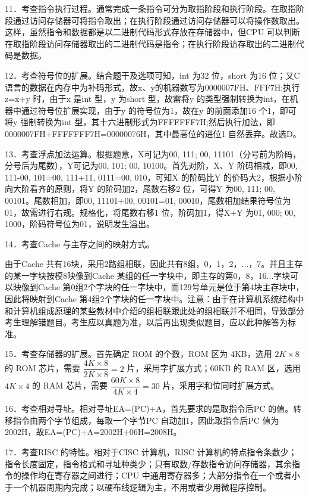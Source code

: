 \documentclass[UTF8,11pt]{ctexart}
\begin{document}
11．考查指令执行过程。通常完成一条指令可分为取指阶段和执行阶段。在取指阶段通过访问存储器可将指令取出；在执行阶段通过访问存储器可以将操作数取出。这样，虽然指令和数据都是以二进制代码形式存放在存储器中，但CPU 可以判断在取指阶段访问存储器取出的二进制代码是指令；在执行阶段访存取出的二进制代码是数据。


12．考查符号位的扩展。结合题干及选项可知，int 为32 位，short 为16 位；又C 语言的数据在内存中为补码形式，故x、y的机器数写为0000007FH、FFF7H;执行z=x+y 时，由于x 是int 型，y 为short 型，故需将y 的类型强制转换为int，在机器中通过符号位扩展实现，由于y 的符号位为1，故在y 的前面添加16 个1，即可将y 强制转换为int 型，其十六进制形式为FFFFFFF7H;然后执行加法，即0000007FH+FFFFFFF7H=00000076H，其中最高位的进位1 自然丢弃。故选D。


13．考查浮点加法运算。根据题意，X可记为00, 111; 00, 11101（分号前为阶码，分号后为尾数），Y可记为00, 101; 00, 10100。首先对阶，X、Y 阶码相减，即00, 111-00, 101=00, 111+11, 0111=00, 010，可知X 的阶码比Y 的价码大2，根据小阶向大阶看齐的原则，将Y 的阶码加2，尾数右移2 位，可得Y 为00, 111; 00, 00101。尾数相加，即00, 11101+00, 00101=01, 00010，尾数相加结果符号位为01，故需进行右规。规格化，将尾数右移1 位，阶码加1，得X+Y 为01, 000; 00, 1000，阶码符号位为01，说明发生溢出。


14．考查Cache 与主存之间的映射方式。


由于Cache 共有16块，采用2路组相联，因此共有8组，0，1，2，...，7。并且主存的某一字块按模8映像到Cache 某组的任一字块中，即主存的第0，8，16...字块可以映像到Cache 第0组2个字块的任一字块中，而129号单元是位于第4块主存块中，因此将映射到Cache 第4组2个字块的任一字块中。注意：由于在计算机系统结构中和计算机组成原理的某些教材中介绍的组相联跟此处的组相联并不相同，导致部分考生理解错题目。考生应以真题为准，以后再出现类似题目，应以此种解答为标准。


15．考查存储器的扩展。首先确定 ROM 的个数，ROM 区为 4KB，选用 \(\displaystyle 2K\times8\) 的 ROM 芯片，需要 \(\displaystyle \dfrac{\displaystyle 4K\times8}{\displaystyle 2K\times8}=2\) 片，采用字扩展方式；60KB 的 RAM 区，选用 \(\displaystyle 4K\times4\) 的 RAM 芯片，需要 \(\displaystyle \dfrac{\displaystyle 60K\times8}{\displaystyle 4K\times4}=30\) 片，采用字和位同时扩展方式。


16．考查相对寻址。相对寻址EA=(PC)+A，首先要求的是取指令后PC 的值。转移指令由两个字节组成，每取一个字节PC 自动加1，因此取指令后PC 值为2002H，故EA=(PC)+A=2002H+06H=2008H。


17．考查RISC 的特性。相对于CISC 计算机，RISC 计算机的特点指令条数少；指令长度固定，指令格式和寻址种类少；只有取数/存数指令访问存储器，其余指令的操作均在寄存器之间进行；CPU 中通用寄存器多；大部分指令在一个或者小于一个机器周期内完成；以硬布线逻辑为主，不用或者少用微程序控制。
\end{document}

